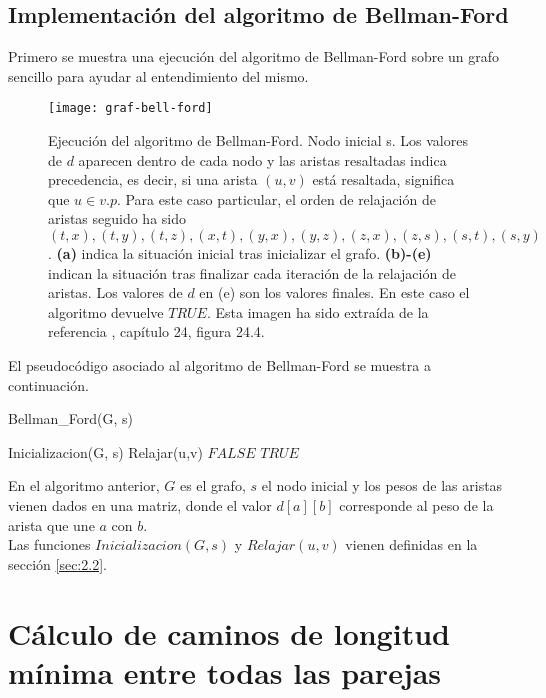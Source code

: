 \subsection{Implementación del algoritmo de Bellman-Ford}

Primero se muestra una ejecución del algoritmo de Bellman-Ford sobre un grafo sencillo para ayudar al entendimiento del mismo.

\begin{figure}[htb]
	\centering
	\texttt{[image: graf-bell-ford]}
	\caption{Ejecución del algoritmo de Bellman-Ford. Nodo inicial s. Los valores de $d$ aparecen dentro de cada nodo y las aristas resaltadas indica precedencia, es decir, si una arista $(u,v)$ está resaltada, significa que $u\in v.p$. Para este caso particular, el orden de relajación de aristas seguido ha sido $(t,x),(t,y),(t,z),(x,t),(y,x),(y,z),(z,x),(z,s),(s,t),(s,y)$. \textbf{(a)} indica la situación inicial tras inicializar el grafo. \textbf{(b)-(e)} indican la situación tras finalizar cada iteración de la relajación de aristas. Los valores de $d$ en (e) son los valores finales. En este caso el algoritmo devuelve $TRUE$. Esta imagen ha sido extraída de la referencia \cite{algorithms}, capítulo 24, figura 24.4.}
	\label{fig:bell-ford}
\end{figure}

El pseudocódigo asociado al algoritmo de Bellman-Ford se muestra a continuación.

\begin{breakablealgorithm}
	\caption{Bellman\_Ford(G, s)}
	\begin{algorithmic}[1]
		\State Inicializacion(G, s)
				\State Relajar(u,v)
			\EndFor
		\EndFor
				\Return $FALSE$
			\EndIf
		\EndFor
		\Return $TRUE$
	\end{algorithmic}
\end{breakablealgorithm}

En el algoritmo anterior, $G$ es el grafo, $s$ el nodo inicial y los pesos de las aristas vienen dados en una matriz, donde el valor $d[a][b]$ corresponde al peso de la arista que une $a$ con $b$. \\

Las funciones $Inicializacion(G,s)$ y $Relajar(u,v)$ vienen definidas en la sección \ref{sec:2.2}.

\section{Cálculo de caminos de longitud mínima entre todas las parejas}

